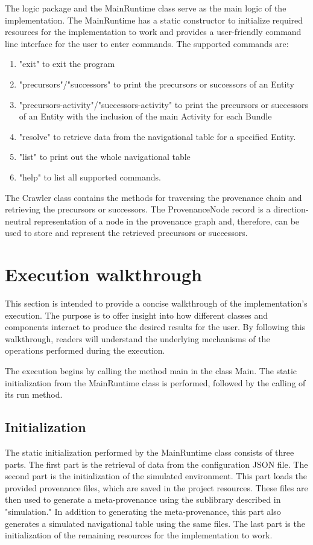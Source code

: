 \documentclass[
  digital,     %
  oneside,     %
  nosansbold,  %
  nocolorbold, %
  lof,         %
  lot,         %
]{fithesis4}
\begin{document}
The logic package and the MainRuntime class serve as the main logic of the implementation. The MainRuntime has a static constructor to initialize required resources for the implementation to work and provides a user-friendly command line interface for the user to enter commands. The supported commands are:

\begin{enumerate}
    \item "exit" to exit the program
    \item "precursors"/"successors" to print the precursors or successors of an Entity
    \item "precursors-activity"/"successors-activity" to print the precursors or successors of an Entity with the inclusion of the main Activity for each Bundle
    \item "resolve" to retrieve data from the navigational table for a specified Entity.
    \item "list" to print out the whole navigational table
    \item "help" to list all supported commands.
\end{enumerate}

The Crawler class contains the methods for traversing the provenance chain and retrieving the precursors or successors. The ProvenanceNode record is a direction-neutral representation of a node in the provenance graph and, therefore, can be used to store and represent the retrieved precursors or successors.

\section{Execution walkthrough}
This section is intended to provide a concise walkthrough of the implementation's execution. The purpose is to offer insight into how different classes and components interact to produce the desired results for the user. By following this walkthrough, readers will understand the underlying mechanisms of the operations performed during the execution. 

The execution begins by calling the method main in the class Main. The static initialization from the MainRuntime class is performed, followed by the calling of its run method.

\subsection{Initialization}
The static initialization performed by the MainRuntime class consists of three parts. The first part is the retrieval of data from the configuration JSON file. The second part is the initialization of the simulated environment. This part loads the provided provenance files, which are saved in the project resources. These files are then used to generate a meta-provenance using the sublibrary described in "simulation." In addition to generating the meta-provenance, this part also generates a simulated navigational table using the same files. The last part is the initialization of the remaining resources for the implementation to work.
\end{document}
